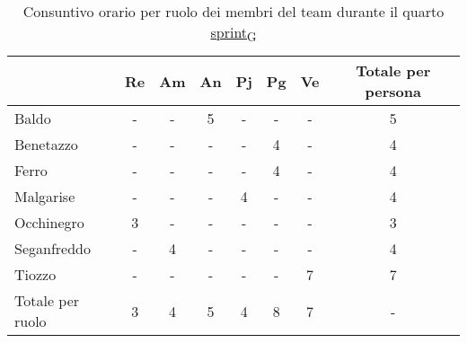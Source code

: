 \begin{table}[!h]
	\centering
	\begin{tabular}{ | l | c | c | c | c | c | c | c | }
		\hline
		\textbf{}        & \textbf{Re} & \textbf{Am} & \textbf{An} & \textbf{Pj} & \textbf{Pg} & \textbf{Ve} & \textbf{Totale per persona} \\
		\hline
		Baldo            & -           & -           & 5           & -           & -           & -           & 5                           \\
		Benetazzo        & -           & -           & -           & -           & 4           & -           & 4                           \\
		Ferro            & -           & -           & -           & -           & 4           & -           & 4                           \\
		Malgarise        & -           & -           & -           & 4           & -           & -           & 4                           \\
		Occhinegro       & 3           & -           & -           & -           & -           & -           & 3                           \\
		Seganfreddo      & -           & 4           & -           & -           & -           & -           & 4                           \\
		Tiozzo           & -           & -           & -           & -           & -           & 7           & 7                           \\
		\hline
		Totale per ruolo & 3           & 4           & 5           & 4           & 8           & 7           & -                           \\
		\hline
	\end{tabular}
	\caption{Consuntivo orario per ruolo dei membri del team durante il quarto \href{https://7last.github.io/docs/pb/documentazione-interna/glossario\#sprint}{sprint\textsubscript{G}}}
	
\end{table}
\newpage
{}
